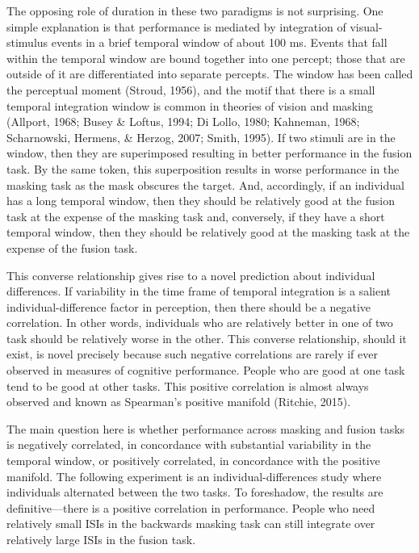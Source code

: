 \documentclass[
  ,man]{apa6}
\begin{document}
The opposing role of duration in these two paradigms is not surprising. One simple explanation is that performance is mediated by integration of visual-stimulus events in a brief temporal window of about 100 ms. Events that fall within the temporal window are bound together into one percept; those that are outside of it are differentiated into separate percepts. The window has been called the perceptual moment (Stroud, 1956), and the motif that there is a small temporal integration window is common in theories of vision and masking (Allport, 1968; Busey \& Loftus, 1994; Di Lollo, 1980; Kahneman, 1968; Scharnowski, Hermens, \& Herzog, 2007; Smith, 1995). If two stimuli are in the window, then they are superimposed resulting in better performance in the fusion task. By the same token, this superposition results in worse performance in the masking task as the mask obscures the target. And, accordingly, if an individual has a long temporal window, then they should be relatively good at the fusion task at the expense of the masking task and, conversely, if they have a short temporal window, then they should be relatively good at the masking task at the expense of the fusion task.

This converse relationship gives rise to a novel prediction about individual differences. If variability in the time frame of temporal integration is a salient individual-difference factor in perception, then there should be a negative correlation. In other words, individuals who are relatively better in one of two task should be relatively worse in the other. This converse relationship, should it exist, is novel precisely because such negative correlations are rarely if ever observed in measures of cognitive performance. People who are good at one task tend to be good at other tasks. This positive correlation is almost always observed and known as Spearman's positive manifold (Ritchie, 2015).

The main question here is whether performance across masking and fusion tasks is negatively correlated, in concordance with substantial variability in the temporal window, or positively correlated, in concordance with the positive manifold. The following experiment is an individual-differences study where individuals alternated between the two tasks. To foreshadow, the results are definitive---there is a positive correlation in performance. People who need relatively small ISIs in the backwards masking task can still integrate over relatively large ISIs in the fusion task.
\end{document}
